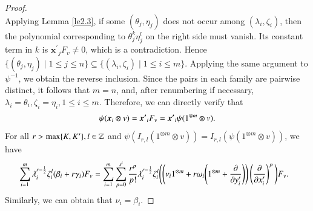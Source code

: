 \documentclass[12pt,reqno]{amsart}
\numberwithin{equation}{section}
\begin{document}
\begin{proof}
\begin{equation}
\end{equation}
Applying Lemma \ref{le2.3},
if some $(\theta_j,\eta_j)$ does not occur among $(\lambda_i,\zeta_i)$, then the polynomial corresponding to $\theta_j^k\eta_j^l$ on the right side must vanish. Its constant term in $k$ is $\boldsymbol{x^\prime}_jF_v\ne0$, which is a contradiction. Hence $\{(\theta_j,\eta_j)\mid 1\le j\le n\} \subseteq \{(\lambda_i,\zeta_i)\mid 1\le i\le m\}$. Applying the same argument to $\psi^{-1}$, we obtain the reverse inclusion. Since the pairs in each family are pairwise distinct, it follows that $m=n$, and, after renumbering if necessary, $\lambda_i=\theta_i, \zeta_i=\eta_i,  1\le i\le m$. Therefore, we can directly verify that
\begin{equation}\label{formula 5.25}
\aligned
\psi(\boldsymbol{x}_i\otimes v)=\boldsymbol{x^\prime}_iF_v=\boldsymbol{x^\prime}_i\psi(1^{\otimes m}\otimes v).
\endaligned 
\end{equation}
For all $r>{\rm max}\{ K,K'\},l\in\mathbb Z$
and $\psi(I_{r,l}(1^{\otimes m}\otimes v))=I_{r,l}(\psi(1^{\otimes m}\otimes v))$, we have
\begin{equation}\label{formula 5.26}
\aligned
&\sum_{i=1}^m\lambda_i^{r-\frac{1}{2}}\zeta_i^l (\beta_i+r\gamma_i)F_v
=\sum_{i=1}^m\sum_{p=0}^{s^i}\frac{r^{p}}{p!}\lambda_i^{r-\frac{1}{2}}\zeta_i^l\Bigg{(} \Bigg(  \nu_i1^{\otimes m}+r\omega_i\Bigg(1^{\otimes m}+\frac{\partial}{\partial{y'_i}}\Bigg)\Bigg)\left(\frac{\partial}{\partial{x'_i}}     \right)^{p}\Bigg{)}F_v.
\endaligned 
\end{equation}
Similarly, we can obtain that $\nu_i=\beta_i$.


\end{proof}
\end{document}
